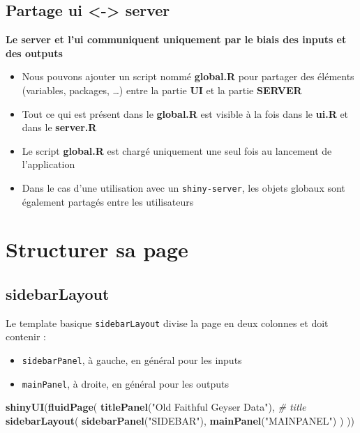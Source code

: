 \documentclass[
]{article}
\newenvironment{Shaded}{\begin{snugshade}}{\end{snugshade}}
\newcommand{\CommentTok}[1]{\textcolor[rgb]{0.56,0.35,0.01}{\textit{#1}}}
\newcommand{\FunctionTok}[1]{\textcolor[rgb]{0.13,0.29,0.53}{\textbf{#1}}}
\newcommand{\NormalTok}[1]{#1}
\newcommand{\StringTok}[1]{\textcolor[rgb]{0.31,0.60,0.02}{#1}}
\begin{document}
\hypertarget{partage-ui---server}{%
\subsection{Partage ui \textless-\textgreater{}
server}\label{partage-ui---server}}

\textbf{Le server et l'ui communiquent uniquement par le biais des
inputs et des outputs}

\begin{itemize}
\item
  Nous pouvons ajouter un script nommé \textbf{global.R} pour partager
  des éléments (variables, packages, \ldots) entre la partie \textbf{UI}
  et la partie \textbf{SERVER}
\item
  Tout ce qui est présent dans le \textbf{global.R} est visible à la
  fois dans le \textbf{ui.R} et dans le \textbf{server.R}
\item
  Le script \textbf{global.R} est chargé uniquement une seul fois au
  lancement de l'application
\item
  Dans le cas d'une utilisation avec un \texttt{shiny-server}, les
  objets globaux sont également partagés entre les utilisateurs
\end{itemize}

\hypertarget{structurer-sa-page}{%
\section{Structurer sa page}\label{structurer-sa-page}}

\hypertarget{sidebarlayout}{%
\subsection{sidebarLayout}\label{sidebarlayout}}

Le template basique \texttt{sidebarLayout} divise la page en deux
colonnes et doit contenir :

\begin{itemize}
\item
  \texttt{sidebarPanel}, à gauche, en général pour les inputs
\item
  \texttt{mainPanel}, à droite, en général pour les outputs
\end{itemize}

\begin{Shaded}
\begin{Highlighting}[]
\FunctionTok{shinyUI}\NormalTok{(}\FunctionTok{fluidPage}\NormalTok{(}
  \FunctionTok{titlePanel}\NormalTok{(}\StringTok{"Old Faithful Geyser Data"}\NormalTok{), }\CommentTok{\# title}
  \FunctionTok{sidebarLayout}\NormalTok{(}
    \FunctionTok{sidebarPanel}\NormalTok{(}\StringTok{"SIDEBAR"}\NormalTok{),}
    \FunctionTok{mainPanel}\NormalTok{(}\StringTok{"MAINPANEL"}\NormalTok{)}
\NormalTok{  )}
\NormalTok{))}
\end{Highlighting}
\end{Shaded}
\end{document}
